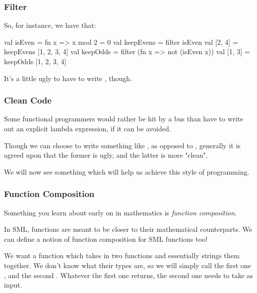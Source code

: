 \documentclass[aspectratio=169, handout]{beamer}
\begin{document}
\begin{frame}[fragile]
  \frametitle{Filter}

  So, for instance, we have that:

  \pause
  \begin{codeblock}
    val isEven = fn x => x mod 2 = 0
    val keepEvens = filter isEven
    val [2, 4] = keepEvens [1, 2, 3, 4]
    val keepOdds = filter (fn x => not (isEven x))
    val [1, 3] = keepOdds [1, 2, 3, 4]
  \end{codeblock}

  \pause
  \vspace{\fill}

  It's a little ugly to have to write , though.
\end{frame}

\begin{frame}[fragile]
  \frametitle{Clean Code}

  Some functional programmers would rather be hit by a bus than have to write
  out an explicit lambda expression, if it can be avoided.

  \pause
  \vspace{\fill}

  Though we can choose to write something like
  , as opposed to , generally
  it is agreed upon that the former is ugly, and the latter is more "clean".

  \pause
  \vspace{\fill}

  We will now see something which will help us achieve this style of programming.
\end{frame}

\begin{frame}[fragile]
  \frametitle{Function Composition}

  Something you learn about early on in mathematics is \textit{function composition}.

  \pause
  \vspace{\fill}

  In SML, functions are meant to be closer to their mathematical counterparts. We
  can define a notion of function composition for SML functions too!

  \pause
  \vspace{\fill}

  We want a function which takes in two functions and essentially strings them
  together. We don't know what their types are, so we will simply call the first
  one , and the second . Whatever the first one
  returns, the second one needs to take as input.
\end{frame}
\end{document}
